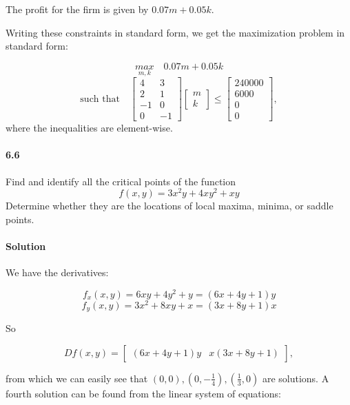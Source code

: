 \documentclass[letterpaper,12pt]{article}
\theoremstyle{definition}
\begin{document}
The profit for the firm is given by  $0.07 m + 0.05 k$.

Writing these constraints in standard form, we get the maximization problem in standard form:

$$ \underset{m, k}{max} \quad 0.07 m + 0.05 k $$
$$ \text{such that} \quad 
\begin{bmatrix}
4 & 3 \\
2 & 1 \\
-1 & 0 \\
0 & -1 
\end{bmatrix}
\begin{bmatrix}
m \\
k
\end{bmatrix}
\le 
\begin{bmatrix}
240000 \\
6000 \\
0 \\
0
\end{bmatrix},
$$
where the inequalities are element-wise. 
                                   
\paragraph{6.6} Find and identify all the critical points of the function
$$f(x, y) = 3x^2y + 4xy^2 + xy$$
Determine whether they are the locations of local maxima, minima, or saddle points.

\paragraph{Solution} We have the derivatives:

$$f_x(x, y) = 6xy + 4y^2 + y = (6x + 4y + 1)y$$
$$f_y(x, y) = 3x^2 + 8xy + x = (3x + 8y + 1)x$$

So 

$$ Df(x,y) = \begin{bmatrix}
(6x + 4y + 1)y & x(3x + 8y + 1)
\end{bmatrix},$$

from which we can easily see that  $(0,0), (0,-\frac{1}{4}), (\frac{1}{3},0)$ are solutions. A fourth solution can be found from the linear system of equations:
\end{document}
